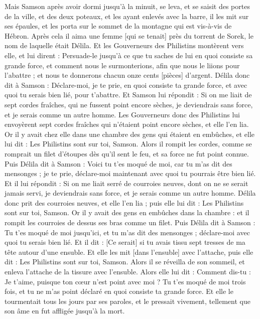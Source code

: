 \begin{multicols}{2}
Mais Samson après avoir dormi jusqu'à la minuit, se leva, et se saisit des portes de la ville, et des deux poteaux, et les ayant enlevés avec la barre, il les mit sur ses épaules, et les porta sur le sommet de la montagne qui est vis-à-vis de Hébron.
Après cela il aima une femme [qui se tenait] près du torrent de Sorek, le nom de laquelle était Délila.
Et les Gouverneurs des Philistins montèrent vers elle, et lui dirent : Persuade-le jusqu'à ce que tu saches de lui en quoi consiste sa grande force, et comment nous le surmonterions, afin que nous le liions pour l'abattre ; et nous te donnerons chacun onze cents [pièces] d'argent.
Délila donc dit à Samson : Déclare-moi, je te prie, en quoi consiste ta grande force, et avec quoi tu serais bien lié, pour t'abattre.
Et Samson lui répondit : Si on me liait de sept cordes fraîches, qui ne fussent point encore sèches, je deviendrais sans force, et je serais comme un autre homme.
Les Gouverneurs donc des Philistins lui envoyèrent sept cordes fraîches qui n'étaient point encore sèches, et elle l'en lia.
Or il y avait chez elle dans une chambre des gens qui étaient en embûches, et elle lui dit : Les Philistins sont sur toi, Samson. Alors il rompit les cordes, comme se romprait un filet d'étoupes dès qu'il sent le feu, et sa force ne fut point connue.
Puis Délila dit à Samson : Voici tu t'es moqué de moi, car tu m'as dit des mensonges ; je te prie, déclare-moi maintenant avec quoi tu pourrais être bien lié.
Et il lui répondit : Si on me liait serré de courroies neuves, dont on ne se serait jamais servi, je deviendrais sans force, et je serais comme un autre homme.
Délila donc prit des courroies neuves, et elle l'en lia ; puis elle lui dit : Les Philistins sont sur toi, Samson. Or il y avait des gens en embûches dans la chambre : et il rompit les courroies de dessus ses bras comme un filet.
Puis Délila dit à Samson : Tu t'es moqué de moi jusqu'ici, et tu m'as dit des mensonges ; déclare-moi avec quoi tu serais bien lié. Et il dit : [Ce serait] si tu avais tissu sept tresses de ma tête autour d'une ensuble.
Et elle les mit [dans l'ensuble] avec l'attache, puis elle dit : Les Philistins sont sur toi, Samson. Alors il se réveilla de son sommeil, et enleva l'attache de la tissure avec l'ensuble.
Alors elle lui dit : Comment dis-tu : Je t'aime, puisque ton cœur n'est point avec moi ? Tu t'es moqué de moi trois fois, et tu ne m'as point déclaré en quoi consiste ta grande force.
Et elle le tourmentait tous les jours par ses paroles, et le pressait vivement, tellement que son âme en fut affligée jusqu'à la mort.

\end{multicols}

